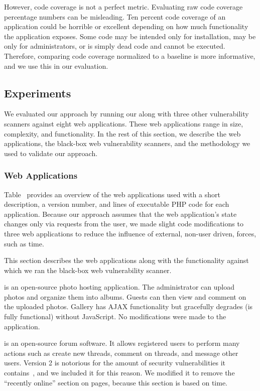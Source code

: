 However, code coverage is not a perfect metric. Evaluating raw code coverage
percentage numbers can be misleading. Ten percent code coverage of an
application could be horrible or excellent depending on how much functionality
the application exposes. Some code may be intended only for installation, may
be only for administrators, or is simply dead code and cannot be executed.
Therefore, comparing code coverage normalized to a baseline is more
informative, and we use this in our evaluation.

\subsection{Experiments}

We evaluated our approach by running our \crawler{} along with three
other vulnerability scanners against eight web applications. These web
applications range in size, complexity, and functionality. In the rest of this
section, we describe the web applications, the black-box web vulnerability
scanners, and the methodology we used to validate our approach.

\subsubsection{Web Applications}

Table~ provides an overview of the web applications used with
a short description, a version number, and lines of executable PHP code for each
application. Because our approach assumes that the web application's state
changes only via requests from the user, we made slight code modifications to three
web applications to reduce the influence of external, non-user driven, forces,
such as time. 

This section describes the web applications along with the functionality
against which we ran the black-box web vulnerability scanner.

\noindent \textbf{\gallery{}} is an open-source photo hosting application. The
administrator can upload photos and organize them into albums. Guests can then
view and comment on the uploaded photos. Gallery has AJAX functionality but
gracefully degrades (is fully functional) without JavaScript. No modifications
were made to the application.

\noindent \textbf{\phpbbtwo{}} is an open-source forum software. It allows
registered users to perform many actions such as create new threads, comment on
threads, and message other users. Version 2 is notorious for the amount of
security vulnerabilities it contains~\cite{bau10:state}, and we
included it for this reason. We modified it to remove the ``recently online''
section on pages, because this section is based on time.

